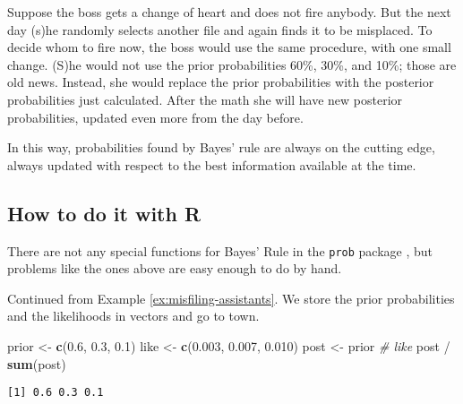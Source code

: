 \documentclass[]{book}
\newenvironment{Shaded}{\begin{snugshade}}{\end{snugshade}}
\newcommand{\KeywordTok}[1]{\textcolor[rgb]{0.13,0.29,0.53}{\textbf{{#1}}}}
\newcommand{\FloatTok}[1]{\textcolor[rgb]{0.00,0.00,0.81}{{#1}}}
\newcommand{\StringTok}[1]{\textcolor[rgb]{0.31,0.60,0.02}{{#1}}}
\newcommand{\CommentTok}[1]{\textcolor[rgb]{0.56,0.35,0.01}{\textit{{#1}}}}
\newcommand{\NormalTok}[1]{{#1}}
\numberwithin{equation}{chapter}
\numberwithin{figure}{chapter}
\theoremstyle{plain}
\theoremstyle{definition}
\theoremstyle{remark}
\theoremstyle{definition}
\theoremstyle{definition}
\theoremstyle{remark}
\let\BeginKnitrBlock\begin \let\EndKnitrBlock\end
\begin{document}
\bigskip

\BeginKnitrBlock{example}
\protect\hypertarget{ex:misfiling-assistants-multiple}{}{\label{ex:misfiling-assistants-multiple}}Suppose
the boss gets a change of heart and does not fire anybody. But the next
day (s)he randomly selects another file and again finds it to be
misplaced. To decide whom to fire now, the boss would use the same
procedure, with one small change. (S)he would not use the prior
probabilities 60\%, 30\%, and 10\%; those are old news. Instead, she
would replace the prior probabilities with the posterior probabilities
just calculated. After the math she will have new posterior
probabilities, updated even more from the day before.
\EndKnitrBlock{example}

In this way, probabilities found by Bayes' rule are always on the
cutting edge, always updated with respect to the best information
available at the time.

\subsection{How to do it with R}\label{how-to-do-it-with-r-18}

There are not any special functions for Bayes' Rule in the \texttt{prob}
package \autocite{prob}, but problems like the ones above are easy
enough to do by hand.

\bigskip

\BeginKnitrBlock{example}[Misfiling Assistants]
\protect\hypertarget{ex:unnamed-chunk-179}{}{\label{ex:unnamed-chunk-179}
\iffalse (Misfiling Assistants) \fi }Continued from Example
\ref{ex:misfiling-assistants}. We store the prior probabilities and the
likelihoods in vectors and go to town.
\EndKnitrBlock{example}

\begin{Shaded}
\begin{Highlighting}[]
\NormalTok{prior <-}\StringTok{ }\KeywordTok{c}\NormalTok{(}\FloatTok{0.6}\NormalTok{, }\FloatTok{0.3}\NormalTok{, }\FloatTok{0.1}\NormalTok{)}
\NormalTok{like <-}\StringTok{ }\KeywordTok{c}\NormalTok{(}\FloatTok{0.003}\NormalTok{, }\FloatTok{0.007}\NormalTok{, }\FloatTok{0.010}\NormalTok{)}
\NormalTok{post <-}\StringTok{ }\NormalTok{prior }\CommentTok{# like}
\NormalTok{post /}\StringTok{ }\KeywordTok{sum}\NormalTok{(post)}
\end{Highlighting}
\end{Shaded}

\begin{verbatim}
[1] 0.6 0.3 0.1
\end{verbatim}
\end{document}
